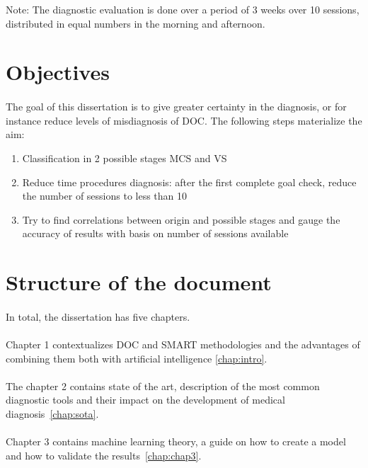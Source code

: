 Note: The diagnostic evaluation is done over a period of 3 weeks over 10 sessions, distributed in equal numbers in the morning and afternoon.\citep{Gill-Thwaites2004}

\section{Objectives} \label{sec:objectives}
\paragraph{}The goal of this dissertation is to give greater certainty in the diagnosis, or for instance reduce levels of misdiagnosis of DOC. The following steps materialize the aim:
\begin{enumerate}
    \item Classification in 2 possible stages MCS and VS
    \item Reduce time procedures diagnosis: after the first complete goal check, reduce the number of sessions to less than 10
    \item Try to find correlations between origin and possible stages and gauge the accuracy of results with basis on number of sessions available
\end{enumerate}
\espaco



\section{Structure of the document} \label{sec:struct}

\paragraph{}In total, the dissertation has five chapters.
\paragraph{}Chapter 1 contextualizes DOC and SMART methodologies and the advantages of combining them both with artificial intelligence \ref{chap:intro}.
\paragraph{} The chapter 2 contains state of the art, description of the most common diagnostic tools and their impact on the development of medical diagnosis~\ref{chap:sota}.
\paragraph{} Chapter 3 contains machine learning theory, a guide on how to create a model and how to validate the results~\ref{chap:chap3}.
